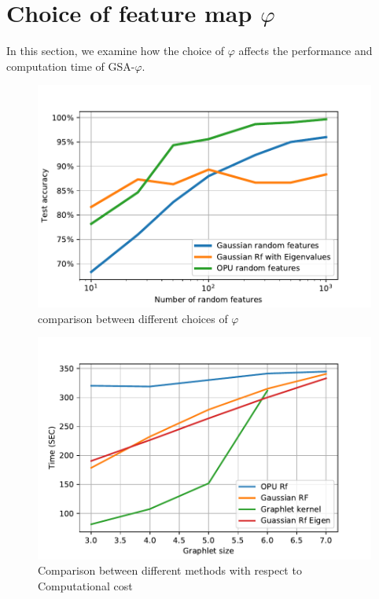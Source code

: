 \section{Choice of feature map $\varphi$}
In this section, we examine how the choice of $\varphi$ affects the performance and computation time of GSA-$\varphi$.
\begin{figure}[H]
\centering
\includegraphics[scale=0.5]{figs/phi_comparison.pdf}
\caption[comparison between different choices of $\varphi$]{comparison between different choices of $\varphi$}
\label{fig:phi_comparison}
\end{figure}

\begin{figure}[H]
\centering
\includegraphics[scale=0.5]{figs/computational_comp.pdf}
\caption[Comparison in Computational cost between methods  ]{Comparison between different methods with respect to Computational cost  }
\label{fig:computational_comparison}
\end{figure}



